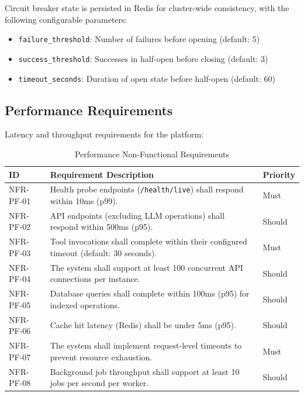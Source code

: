 Circuit breaker state is persisted in Redis for cluster-wide consistency, with the following configurable parameters:
\begin{itemize}
    \item \texttt{failure\_threshold}: Number of failures before opening (default: 5)
    \item \texttt{success\_threshold}: Successes in half-open before closing (default: 3)
    \item \texttt{timeout\_seconds}: Duration of open state before half-open (default: 60)
\end{itemize}

\subsection{Performance Requirements}
\label{subsec:nfr-performance}

Latency and throughput requirements for the platform:

\begin{table}[htbp]
\centering
\caption{Performance Non-Functional Requirements}
\label{tab:nfr-performance}
\small
\begin{tabularx}{\textwidth}{|l|X|l|}
\hline
\textbf{ID} & \textbf{Requirement Description} & \textbf{Priority} \\
\hline
NFR-PF-01 & Health probe endpoints (\texttt{/health/live}) shall respond within 10ms (p99). & Must \\
\hline
NFR-PF-02 & API endpoints (excluding LLM operations) shall respond within 500ms (p95). & Should \\
\hline
NFR-PF-03 & Tool invocations shall complete within their configured timeout (default: 30 seconds). & Must \\
\hline
NFR-PF-04 & The system shall support at least 100 concurrent API connections per instance. & Should \\
\hline
NFR-PF-05 & Database queries shall complete within 100ms (p95) for indexed operations. & Should \\
\hline
NFR-PF-06 & Cache hit latency (Redis) shall be under 5ms (p95). & Should \\
\hline
NFR-PF-07 & The system shall implement request-level timeouts to prevent resource exhaustion. & Must \\
\hline
NFR-PF-08 & Background job throughput shall support at least 10 jobs per second per worker. & Should \\
\hline
\end{tabularx}
\end{table}

